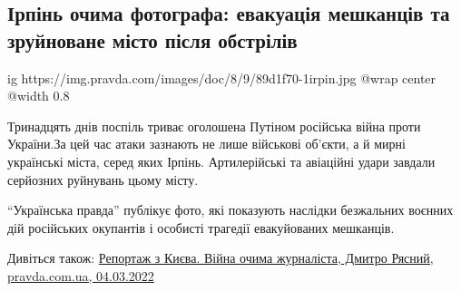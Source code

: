  
 
 
 
 
 
\subsection{Ірпінь очима фотографа: евакуація мешканців та зруйноване місто після обстрілів}
\label{sec:09_03_2022.stz.news.ua.pravda.1.irpen}
 

\ifcmt
  ig https://img.pravda.com/images/doc/8/9/89d1f70-1irpin.jpg
  @wrap center
  @width 0.8
\fi

\begin{zznagolos}
Тринадцять днів поспіль триває оголошена Путіном російська війна проти
України.За цей час атаки зазнають не лише військові об'єкти, а й мирні
українські міста, серед яких Ірпінь. Артилерійські та авіаційні удари завдали
серйозних руйнувань цьому місту.

\enquote{Українська правда} публікує фото, які показують наслідки безжальних
воєнних дій російських окупантів і особисті трагедії евакуйованих мешканців.
\end{zznagolos}

Дивіться також: \href{https://www.pravda.com.ua/articles/2022/03/4/7328163/}{%
Репортаж з Києва. Війна очима журналіста, Дмитро Рясний, pravda.com.ua, 04.03.2022}









